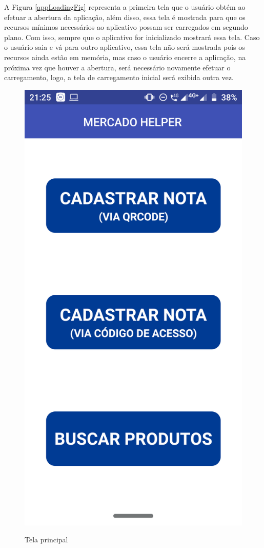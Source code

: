 A Figura \ref{appLoadingFig} representa a primeira tela que o usuário obtém ao efetuar a abertura da aplicação, além disso, essa tela é mostrada para que os recursos mínimos necessários ao aplicativo possam ser carregados em segundo plano. Com isso, sempre que o aplicativo for inicializado mostrará essa tela. Caso o usuário saia e vá para outro aplicativo, essa tela não será mostrada pois os recursos ainda estão em memória, mas caso o usuário encerre a aplicação, na próxima vez que houver a abertura, será necessário novamente efetuar o carregamento, logo, a tela de carregamento inicial será exibida outra vez.

\begin{figure}[h]
    \centering
    \caption{Tela principal}
    \includegraphics[scale=0.15]{tcc/figures/app/app_home.png}
    \label{appHomeFig}
\end{figure}

